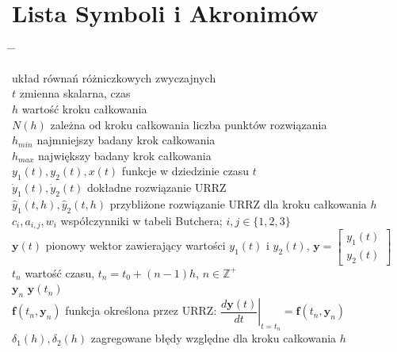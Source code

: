 \documentclass[a4paper, 12pt, twoside, openany]{article}
\begin{document}
    \section{Lista Symboli i Akronimów}
    \begin{spacing}{1.5}
    \begin{tabbing}
        \hspace{5cm} \= \hspace{10cm} \= \kill

         \> układ równań różniczkowych zwyczajnych \\
        $t$ \> zmienna skalarna, czas \\
        $h$ \> wartość kroku całkowania \\
        $N(h)$ \> zależna od kroku całkowania liczba punktów rozwiązania \\
        $h_{min}$ \> najmniejszy badany krok całkowania \\
        $h_{max}$ \> największy badany krok całkowania \\
        $y_1(t),y_2(t),x(t)$ \> funkcje w dziedzinie czasu $t$ \\
        $\dot{y}_1(t),\dot{y}_2(t)$ \> dokładne rozwiązanie URRZ \\
        $\hat{y}_1(t,h),\hat{y}_2(t,h)$ \> przybliżone rozwiązanie URRZ dla kroku całkowania $h$ \\
        $c_i, a_{i,j}, w_i$ \> współczynniki w tabeli Butchera; $i,j \in \{1,2,3\}$ \\
        $\mathbf{y}(t)$ \> pionowy wektor zawierający wartości $y_1(t)$ i $y_2(t)$, $\mathbf{y} = \begin{bmatrix} y_1(t)\\y_2(t) \end{bmatrix}$ \\
        $t_n$ \> wartość czasu, $t_n = t_0 + (n-1)h$, $n \in \mathbb{Z}^+$ \\
        $\mathbf{y}_n$ \> $\mathbf{y}(t_n)$ \\
        $\mathbf{f}(t_n,\mathbf{y}_n)$ \> funkcja określona przez URRZ: $\left. \dfrac{d\mathbf{y}(t)}{dt} \right|_{t=t_n} = \mathbf{f}(t_n,\mathbf{y}_n)$ \\
        $\delta_1(h), \delta_2(h)$ \> zagregowane błędy względne dla kroku całkowania $h$\\

    \end{tabbing}
    \end{spacing}
    \newpage
\end{document}
